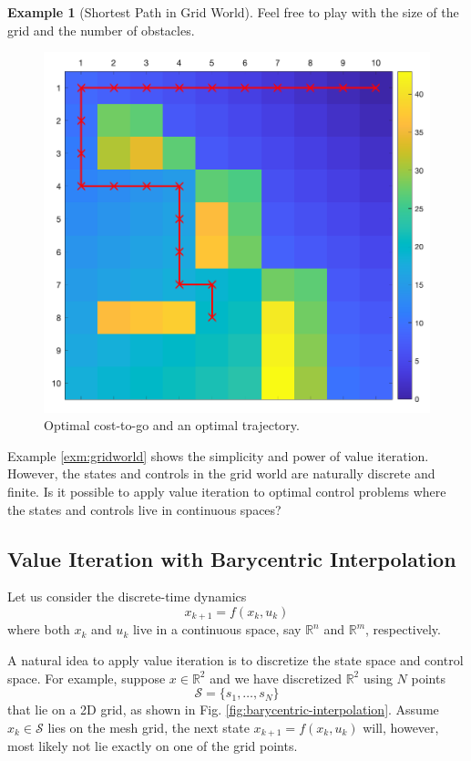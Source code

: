 \documentclass[
]{book}
\theoremstyle{definition}
\theoremstyle{definition}
\newtheorem{example}{Example}[chapter]
\theoremstyle{definition}
\theoremstyle{definition}
\theoremstyle{remark}
\begin{document}
\begin{example}[Shortest Path in Grid World]
Feel free to play with the size of the grid and the number of obstacles.

\begin{figure}

{\centering \includegraphics[width=0.5\linewidth]{images/grid-world-solution} 

}

\caption{Optimal cost-to-go and an optimal trajectory.}\label{fig:grid-world-solution}
\end{figure}

\end{example}

Example \ref{exm:gridworld} shows the simplicity and power of value iteration. However, the states and controls in the grid world are naturally discrete and finite. Is it possible to apply value iteration to optimal control problems where the states and controls live in continuous spaces?

\hypertarget{value-iteration-with-barycentric-interpolation}{%
\subsection{Value Iteration with Barycentric Interpolation}\label{value-iteration-with-barycentric-interpolation}}

Let us consider the discrete-time dynamics
\[
x_{k+1} = f(x_k, u_k)
\]
where both \(x_k\) and \(u_k\) live in a continuous space, say \(\mathbb{R}^{n}\) and \(\mathbb{R}^m\), respectively.

A natural idea to apply value iteration is to discretize the state space and control space. For example, suppose \(x \in \mathbb{R}^2\) and we have discretized \(\mathbb{R}^2\) using \(N\) points
\[
\mathcal{S} = \{s_1,\dots,s_N\}
\]
that lie on a 2D grid, as shown in Fig. \ref{fig:barycentric-interpolation}. Assume \(x_k \in \mathcal{S}\) lies on the mesh grid, the next state \(x_{k+1} = f(x_k,u_k)\) will, however, most likely not lie exactly on one of the grid points.
\end{document}
